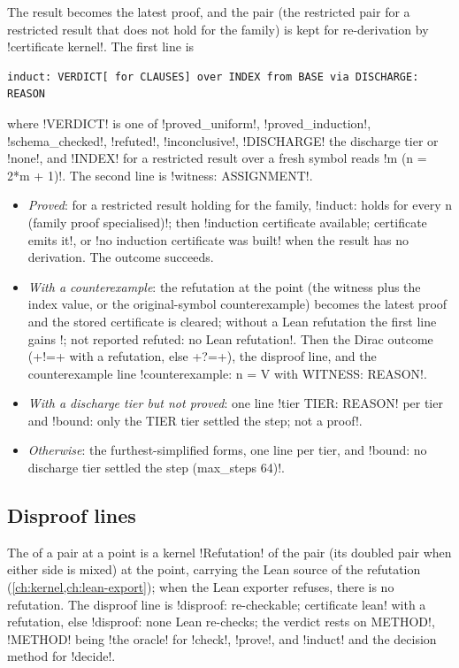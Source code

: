 The result becomes the latest proof, and the pair (the restricted pair for a restricted result that does not hold for the family) is kept for re-derivation by \azx!certificate kernel!. The first line is
\begin{lstlisting}[style=grammar]
induct: VERDICT[ for CLAUSES] over INDEX from BASE via DISCHARGE: REASON
\end{lstlisting}
where \code!VERDICT! is one of \code!proved_uniform!, \code!proved_induction!, \code!schema_checked!, \code!refuted!, \code!inconclusive!, \code!DISCHARGE! the discharge tier or \code!none!, and \code!INDEX! for a restricted result over a fresh symbol reads \code!m (n = 2*m + 1)!. The second line is \code!witness: ASSIGNMENT!.
\begin{itemize}
\item \emph{Proved}: for a restricted result holding for the family, \code!induct: holds for every n (family proof specialised)!; then \code!induction certificate available; certificate emits it!, or \code!no induction certificate was built! when the result has no derivation. The outcome succeeds.
\item \emph{With a counterexample}: the refutation at the point (the witness plus the index value, or the original-symbol counterexample) becomes the latest proof and the stored certificate is cleared; without a Lean refutation the first line gains \code!; not reported refuted: no Lean refutation!. Then the Dirac outcome (\code+!=+ with a refutation, else \code+?=+), the disproof line, and the counterexample line \code!counterexample: n = V with WITNESS: REASON!.
\item \emph{With a discharge tier but not proved}: one line \code!tier TIER: REASON! per tier and \code!bound: only the TIER tier settled the step; not a proof!.
\item \emph{Otherwise}: the furthest-simplified forms, one line per tier, and \code!bound: no discharge tier settled the step (max_steps 64)!.
\end{itemize}

\subsection{Disproof lines}\label{sec:language-disproof}

The  of a pair at a point is a kernel \py!Refutation! of the pair (its doubled pair when either side is mixed) at the point, carrying the Lean source of the refutation (\cref{ch:kernel,ch:lean-export}); when the Lean exporter refuses, there is no refutation. The disproof line is \code!disproof: re-checkable; certificate lean! with a refutation, else \code!disproof: none Lean re-checks; the verdict rests on METHOD!, \code!METHOD! being \code!the oracle! for \azx!check!, \azx!prove!, and \azx!induct! and the decision method for \azx!decide!.

